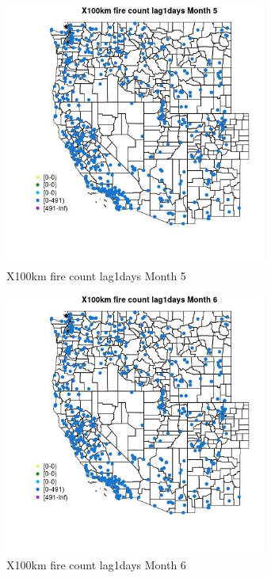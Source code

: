 \begin{figure} 
\centering  
\includegraphics[width=0.77\textwidth]{Code_Outputs/Report_ML_input_PM25_Step4_part_e_de_duplicated_aves_compiled_2019-05-14wNAs_MapObsMo5X100km_fire_count_lag1days.jpg} 
\caption{\label{fig:Report_ML_input_PM25_Step4_part_e_de_duplicated_aves_compiled_2019-05-14wNAsMapObsMo5X100km_fire_count_lag1days}X100km fire count lag1days Month 5} 
\end{figure} 
 

\begin{figure} 
\centering  
\includegraphics[width=0.77\textwidth]{Code_Outputs/Report_ML_input_PM25_Step4_part_e_de_duplicated_aves_compiled_2019-05-14wNAs_MapObsMo6X100km_fire_count_lag1days.jpg} 
\caption{\label{fig:Report_ML_input_PM25_Step4_part_e_de_duplicated_aves_compiled_2019-05-14wNAsMapObsMo6X100km_fire_count_lag1days}X100km fire count lag1days Month 6} 
\end{figure} 
 

